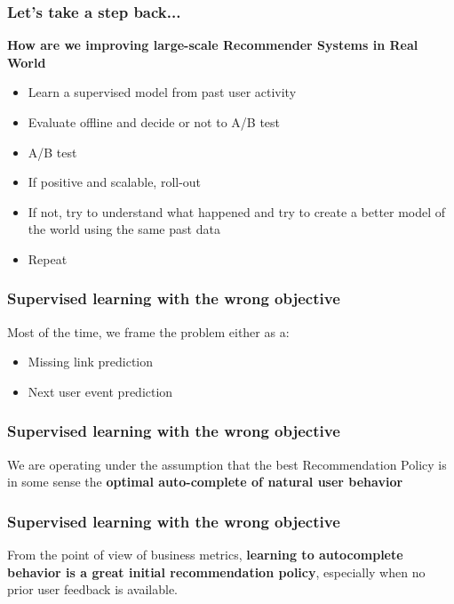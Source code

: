 \begin{frame}
  \frametitle{Let's take a step back...}
  
  \textbf{How are we improving large-scale Recommender Systems in Real World}
  
  \begin{itemize}
  \item Learn a supervised model from past user activity
  \item Evaluate offline and decide or not to A/B test
  \item A/B test
  \item If positive and scalable, roll-out
  \item If not, try to understand what happened and try to create a better model of the world using the same past data
  \item Repeat
  \end{itemize}
        
  \end{frame}
  



  
  
  
  \begin{frame}
    \frametitle{Supervised learning with the wrong objective}
  
  Most of the time, we frame the problem either as a: 
  \begin{itemize}
  \item Missing link prediction
  \item Next user event prediction
  \end{itemize}
  
  \end{frame}
  
  
  \begin{frame}
    \frametitle{Supervised learning with the wrong objective}
  
  We are operating under the assumption that the best Recommendation Policy is in some sense the \textbf{optimal auto-complete of natural user behavior}
  
  \end{frame}
  
  
  \begin{frame}
    \frametitle{Supervised learning with the wrong objective}
  
  From the point of view of business metrics, \textbf{learning to autocomplete behavior is a great initial recommendation policy}, especially when no prior user feedback is available. 
  
  \end{frame}
  
